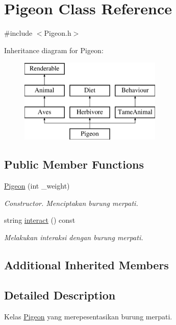 \hypertarget{classPigeon}{\section{Pigeon Class Reference}
\label{classPigeon}
}


{\ttfamily \#include $<$Pigeon.\+h$>$}

Inheritance diagram for Pigeon\+:\begin{figure}[H]
\begin{center}
\leavevmode
\includegraphics[height=4.000000cm]{classPigeon}
\end{center}
\end{figure}
\subsection*{Public Member Functions}
\begin{DoxyCompactItemize}
\item 
\hypertarget{classPigeon_afd6a1821b454a7b9e9e9578361e094f9}{\hyperlink{classPigeon_afd6a1821b454a7b9e9e9578361e094f9}{Pigeon} (int \+\_\+weight)}\label{classPigeon_afd6a1821b454a7b9e9e9578361e094f9}

\begin{DoxyCompactList}\small\item\em Constructor. Menciptakan burung merpati. \end{DoxyCompactList}\item 
string \hyperlink{classPigeon_afc660fc41d2ff1705be7f8751d644730}{interact} () const 
\begin{DoxyCompactList}\small\item\em Melakukan interaksi dengan burung merpati. \end{DoxyCompactList}\end{DoxyCompactItemize}
\subsection*{Additional Inherited Members}


\subsection{Detailed Description}
Kelas \hyperlink{classPigeon}{Pigeon} yang merepesentasikan burung merpati. 

